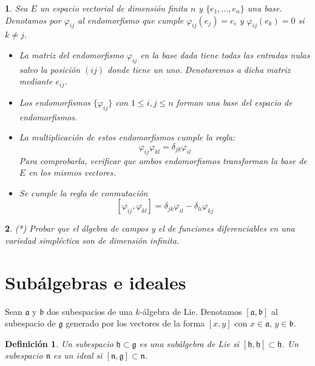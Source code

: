 \documentclass[a4paper,draft,12pt]{scrartcl}
\newtheorem{defi}{Definición}[section]%
\newtheorem{pro1}{}%
\newenvironment{pro}{\begin{pro1} \rm} {\end{pro1}}
\newcommand{\g}{\mathfrak{g}}%
\newcommand{\df}[1]{\textsf{\color{blue}#1}}
\begin{document}
\begin{pro}

Sea $E$ un espacio vectorial de dimensión finita $n$ y $\{e_1, \dots,e_n\}$ una base.  Denotamos por $\varphi_{ij}$ al endomorfismo que cumple $\varphi_{ij}(e_j)=e_i$ y $\varphi_{ij}(e_k)=0$ si $k \neq j$.

\begin{itemize}

\item La matriz del endomorfismo $\varphi_{ij}$ en la base dada tiene todas las entradas nulas salvo la posición $(ij)$ donde tiene un uno.  Denotaremos a dicha matriz mediante $e_{ij}$.

\item Los endomorfismos $\{\varphi_{ij}\}$ con $ 1 \leq i,j\leq n$ forman una base del espacio de endomorfismos.

\item La multiplicación de estos endomorfismos cumple la regla:
\[
\varphi_{ij} \varphi_{kl} = \delta_{jk} \varphi_{il}
\]
Para comprobarla, verificar que ambos endomorfismos transforman la base de $E$ en los mismos  vectores.

\item Se cumple la regla de conmutación
\[
[\varphi_{ij}, \varphi_{kl}]= \delta_{jk}\varphi_{il}-\delta_{li} \varphi_{kj}
\]

\end{itemize}

\end{pro}




\begin{pro}
   (*)     Probar que el álgebra de campos y el de funciones diferenciables en una variedad simpléctica son de dimensión infinita. 
\end{pro}


\newpage

\section{Subálgebras e ideales}

        Sean   $\mathfrak{a}$  y  $\mathfrak{b}$  dos subespacios de una  $k$-álgebra de Lie. Denotamos $[\mathfrak{a},\mathfrak{b}]$ al subespacio de $\g$ generado por los vectores de la forma $[x,y]$ con $ x\in \mathfrak{a}$, $  y \in  \mathfrak{b}$.

\begin{defi}

Un subespacio   $\mathfrak{h} \subset  \g$  es una \df{subálgebra de Lie}   si   $[\mathfrak{h},\mathfrak{h}] \subset  \mathfrak{h}$.  
Un subespacio  $\mathfrak{n}$  es un \df{ideal}    si $[\mathfrak{n},\g] \subset   \mathfrak{n}$.

\end{defi}
\end{document}
